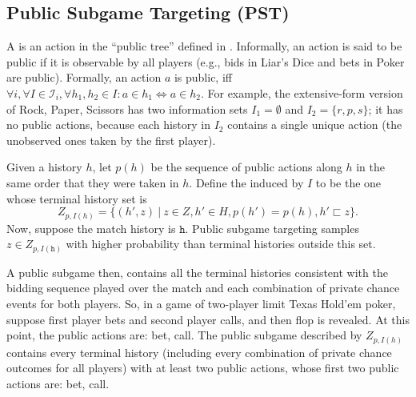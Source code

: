 \documentclass[letterpaper]{article}
\newcommand{\cI}{\mathcal{I}}
\newcommand{\tth}{\mathtt{h}}
\newcommand{\defword}[1]{\textbf{\boldmath{#1}}}
\begin{document}
\subsection{Public Subgame Targeting (PST)}

A \defword{public action} is an action in the ``public tree'' defined in \cite{12aamas-pcs}. Informally, an action is said to be public if it is observable by all players (e.g., bids in Liar's Dice and bets in Poker are public). Formally, an action $a$ is public, iff 
$\forall i, \forall I \in \cI_i, \forall h_1,h_2\in I: a\in h_1 \Leftrightarrow a\in h_2$.
For example, the extensive-form version of Rock, Paper, Scissors has two information 
sets $I_1 = \emptyset$ and $I_2 = \{ r, p, s \}$; it has no public actions, because each history in 
$I_2$ contains a single unique action (the unobserved ones taken by the first player).  


Given a history $h$, let $p(h)$ be the sequence of public actions along $h$ in the same order that they were taken in $h$. 
Define the \defword{public subgame} induced by $I$ to be the one whose terminal history set is
\[Z_{p,I(h)} = \{(h',z)~|~z \in Z, h' \in H, p(h') = p(h), h' \sqsubset z \}.\]
Now, suppose the match history is $\tth$.
Public subgame targeting samples $z \in Z_{p,I(\tth)}$ with higher probability than terminal histories outside this set.

A public subgame then, contains all the terminal histories consistent with the bidding sequence played over the match and
each combination of private chance events for both players. So, in a game of two-player limit Texas Hold'em poker, suppose 
first player bets and second player calls, and then flop is revealed. At this point, the public actions are: bet, call. 
The public subgame described by $Z_{p,I(h)}$ contains every terminal history (including every combination of private chance 
outcomes for all players) with at least two public actions, whose first two public actions are: bet, call.  

\end{document}
